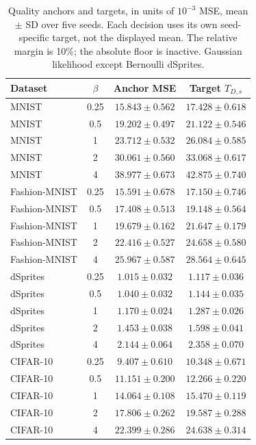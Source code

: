 \begin{table}[H]
\caption{Quality anchors and targets, in units of $10^{-3}$ MSE, mean $\pm$ SD over five seeds. Each decision uses its own seed-specific target, not the displayed mean. The relative margin is 10\%; the absolute floor is inactive. Gaussian likelihood except Bernoulli dSprites.}\label{tab:anchors}
\small
\setlength{\tabcolsep}{3.5pt}
\begin{tabular*}{\textwidth}{@{\extracolsep{\fill}}lccc@{}}
\toprule
Dataset & $\beta$ & Anchor MSE & Target $T_{D,s}$ \\
\midrule
MNIST & 0.25 & $15.843 \pm 0.562$ & $17.428 \pm 0.618$ \\
MNIST & 0.5 & $19.202 \pm 0.497$ & $21.122 \pm 0.546$ \\
MNIST & 1 & $23.712 \pm 0.532$ & $26.084 \pm 0.585$ \\
MNIST & 2 & $30.061 \pm 0.560$ & $33.068 \pm 0.617$ \\
MNIST & 4 & $38.977 \pm 0.673$ & $42.875 \pm 0.740$ \\
Fashion-MNIST & 0.25 & $15.591 \pm 0.678$ & $17.150 \pm 0.746$ \\
Fashion-MNIST & 0.5 & $17.408 \pm 0.513$ & $19.148 \pm 0.564$ \\
Fashion-MNIST & 1 & $19.679 \pm 0.162$ & $21.647 \pm 0.179$ \\
Fashion-MNIST & 2 & $22.416 \pm 0.527$ & $24.658 \pm 0.580$ \\
Fashion-MNIST & 4 & $25.967 \pm 0.587$ & $28.564 \pm 0.645$ \\
dSprites & 0.25 & $1.015 \pm 0.032$ & $1.117 \pm 0.036$ \\
dSprites & 0.5 & $1.040 \pm 0.032$ & $1.144 \pm 0.035$ \\
dSprites & 1 & $1.170 \pm 0.024$ & $1.287 \pm 0.026$ \\
dSprites & 2 & $1.453 \pm 0.038$ & $1.598 \pm 0.041$ \\
dSprites & 4 & $2.144 \pm 0.064$ & $2.358 \pm 0.070$ \\
CIFAR-10 & 0.25 & $9.407 \pm 0.610$ & $10.348 \pm 0.671$ \\
CIFAR-10 & 0.5 & $11.151 \pm 0.200$ & $12.266 \pm 0.220$ \\
CIFAR-10 & 1 & $14.064 \pm 0.108$ & $15.470 \pm 0.119$ \\
CIFAR-10 & 2 & $17.806 \pm 0.262$ & $19.587 \pm 0.288$ \\
CIFAR-10 & 4 & $22.399 \pm 0.286$ & $24.638 \pm 0.314$ \\
\bottomrule
\end{tabular*}
\end{table}

